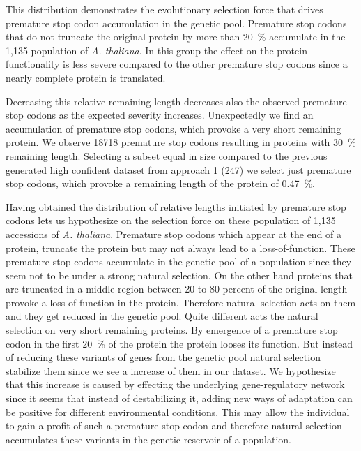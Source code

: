 This distribution demonstrates the evolutionary selection force that drives premature stop codon accumulation in the genetic pool. Premature stop codons that do not truncate the original protein by more than \SI{20}{\percent} accumulate in the 1,135 population of \textit{A. thaliana}. In this group the effect on the protein functionality is less severe compared to the other premature stop codons since a nearly complete protein is translated. 

Decreasing this relative remaining length decreases also the observed premature stop codons as the expected severity increases. Unexpectedly we find an accumulation of premature stop codons, which provoke a very short remaining protein. We observe 18718 premature stop codons resulting in proteins with \SI{30}{\percent} remaining length. Selecting a subset equal in size compared to the previous generated high confident dataset from approach 1 (247) we select just premature stop codons, which provoke a remaining length of the protein of \SI{0.47}{\percent}. 

Having obtained the distribution of relative lengths initiated by premature stop codons lets us hypothesize on the selection force on these population of 1,135 accessions of \textit{A. thaliana}. Premature stop codons which appear at the end of a protein, truncate the protein but may not always lead to a loss-of-function. These premature stop codons accumulate in the genetic pool of a population since they seem not to be under a strong natural selection. On the other hand proteins that are truncated in a middle region between 20 to 80 percent of the original length provoke a loss-of-function in the protein. Therefore natural selection acts on them and they get reduced in the genetic pool. Quite different acts the natural selection on very short remaining proteins. By emergence of a premature stop codon in the first \SI{20}{\percent} of the protein the protein looses its function. But instead of reducing these variants of genes from the genetic pool natural selection stabilize them since we see a increase of them in our dataset. We hypothesize that this increase is caused by effecting the underlying gene-regulatory network since it seems that instead of destabilizing it, adding new ways of adaptation can be positive for different environmental conditions. This may allow the individual to gain a profit of such a premature stop codon and therefore natural selection accumulates these variants in the genetic reservoir of a population.

